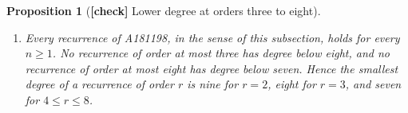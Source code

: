 \documentclass[11pt,letterpaper]{article}
\numberwithin{equation}{section}
\newtheorem{proposition}[theorem]{Proposition}
\theoremstyle{definition}
\newcommand{\1}{\mathbf 1}
\begin{document}
\begin{proposition}[\textbf{[check]} Lower degree at orders three to eight]
\begin{enumerate}[label=(\alph*),leftmargin=*]
\begin{align*}
    &\hspace{14mm}-1948559n^2-1282655n-449532),\\
 \tilde q_0&=-15304704(2n-1)^2(2n+1)(4n-1)(4n+1)(4n+3)(4n+5),
\end{align*}
and $\sum_{j=0}^4\tilde q_j(n)a_{n+j}=0$ for every $n\ge1$: A181198 obeys
a recurrence of order four and degree seven.
\item Every recurrence of A181198, in the sense of this subsection, holds
for every $n\ge1$. No recurrence of order at most three has degree below
eight, and no recurrence of order at most eight has degree below seven.
Hence the smallest degree of a recurrence of order $r$ is nine for $r=2$,
eight for $r=3$, and seven for $4\le r\le8$.
\end{enumerate}
\end{proposition}
\end{document}

